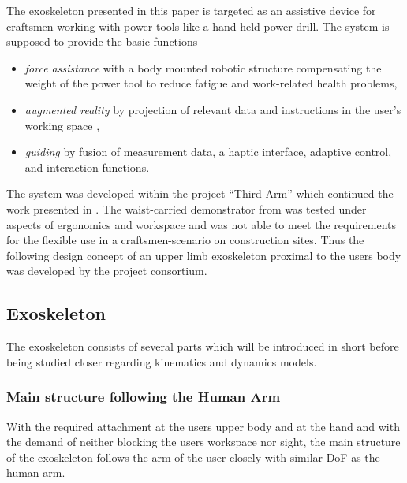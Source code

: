 \documentclass[letterpaper, 10 pt, conference]{ieeeconf}  %
\begin{document}
The exoskeleton presented in this paper is targeted as an assistive device for craftsmen working with power tools like a hand-held power drill.
The system is supposed to provide the basic functions
%
\begin{itemize}
    \item \emph{force assistance} with a body mounted robotic structure compensating the weight of the power tool to reduce fatigue and work-related health problems,
    \item \emph{augmented reality} by projection of relevant data and instructions in the user's working space \cite{NuelleBriTapDem2018},
    \item \emph{guiding} by fusion of measurement data, a haptic interface, adaptive control, and interaction functions.
\end{itemize}
%
%
%
The system was developed within the project ``Third Arm'' \cite{NuelleSchTapLil2017} which continued the work presented in \cite{PetereitAlbJerSch2012}. 
The waist-carried demonstrator from \cite{PetereitAlbJerSch2012} was tested under aspects of ergonomics and workspace and was not able to meet the requirements for the flexible use in a  craftsmen-scenario on construction sites. Thus the following design concept of an upper limb exoskeleton proximal to the users body was developed by the project consortium.

\subsection{Exoskeleton}

The exoskeleton consists of several parts which will be introduced in short before being studied closer regarding kinematics and dynamics models.

\subsubsection{Main structure following the Human Arm}

With the required attachment at the users upper body and at the hand and with the demand of neither blocking the users workspace nor sight, the main structure of the exoskeleton follows the arm of the user closely with similar DoF as the human arm.
\end{document}
